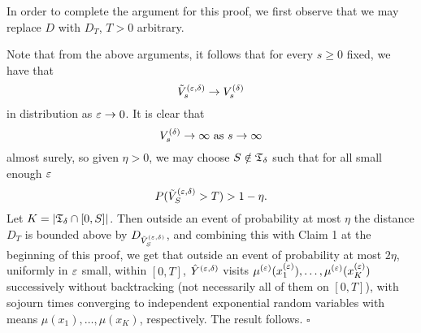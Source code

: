 In order to complete the argument for this proof, we first observe that we may replace $D$ 
with $D_T$, $T>0$ arbitrary. 

Note that from the above arguments, it follows that for every $s\geq0$ fixed, we have that
\begin{equation}\label{vtov}
 \bved_s\to V^{(\d)}_s
\end{equation}
in distribution as $\varepsilon\to0$.
It is clear that 
\begin{equation}
\label{eq:vdinf}
\bvd_s\to\infty \mbox{ as } s\to\infty 
\end{equation}
almost surely, so given $\eta>0$, we may choose $S\notin{\mathfrak T}_\delta$ such that for all small enough $\varepsilon$
\begin{equation}
\label{eq:st}
P(\bved_S>T)>1-\eta. 
\end{equation}
Let $K=|{\mathfrak T}_{\delta}\cap[0,S]|$. Then outside an event of probability at
most $\eta$ the distance $D_T$ is bounded above by $D_{\tilde V^{(\varepsilon,\delta)}_S}$, and combining this with Claim 1 at the beginning
of this proof, 
we get that outside an event of probability at most $2\eta$, uniformly in $\varepsilon$ small, within $[0,T]$,
$\hat Y^{(\varepsilon,\delta)}$ visits $\mu^{(\varepsilon)}(x^{(\varepsilon)}_1),\ldots,\mu^{(\varepsilon)}(x^{(\varepsilon)}_K)$ successively without backtracking (not necessarily all of them
on $[0,T]$),
with sojourn times converging to independent exponential random variables
with means $\mu(x_1),\ldots,\mu(x_K)$, respectively. 
The result follows.
%
$\square$


